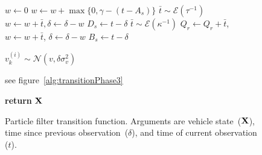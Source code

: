 \documentclass[draftcls,a4paper,onecolumn]{IEEEtran}\usepackage[]{graphicx}\usepackage[]{color}
\begin{document}
\begin{figure}[bt]
  \begin{algorithmic}
    
    \State $w\gets 0$
      \State $w\gets w + \max\{0, \gamma - (t - A_s)\}$
      \State $\bar t \sim \mathcal{E}(\tau^{-1})$
      \State $w\gets w + \bar t, \delta\gets \delta - w$
        \State $D_s\gets t - \delta$
      \EndIf
      \State $\bar t \sim \mathcal{E}(\kappa^{-1})$
      \State $Q_r\gets Q_r + \bar t$, $w\gets w+\bar t$, $\delta\gets \delta - w$
        \State $B_s\gets t - \delta$
      \EndIf
    \EndIf
    \EndPhase
    
    
    \State $v_k^{(i)}\sim \mathcal{N}(v, \delta\sigma_v^2)$
    \EndPhase
    
    \State see figure~\ref{alg:transitionPhase3}
    \EndPhase
    
    \State \textbf{return} $\mathbf{X}$
    \EndFunction
  \end{algorithmic}
  \caption{Particle filter transition function. Arguments are vehicle state~($\mathbf{X}$), time since previous observation~($\delta$), and time of current observation ($t$).}
  \label{alg:transition}
\end{figure}
\end{document}
